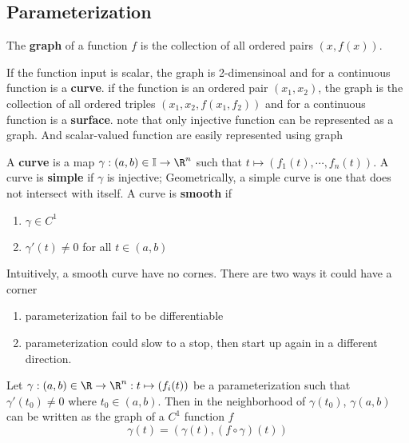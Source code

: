 \documentclass[11pt]{article}
\begin{document}
\subsection{Parameterization}


\begin{defn*}
  The \textbf{graph} of a function $f$ is the collection of all ordered pairs $(x, f(x))$.
  \begin{rem}
    If the function input is scalar, the graph is 2-dimensinoal and for a continuous function is a \textbf{curve}. if the function is an ordered pair $(x_1, x_2)$, the graph is the collection of all ordered triples $(x_1, x_2, f(x_1, f_2))$ and for a continuous function is a \textbf{surface}. note that only injective function can be represented as a graph. And scalar-valued function are easily represented using graph
  \end{rem}
\end{defn*}


\begin{defn*}
  A \textbf{curve} is a map $\gamma : (a,b) \in \mathbb{I} \to \R^n$ such that $t \mapsto (f_1(t),\cdots, f_n(t))$. A curve is \textbf{simple} if $\gamma$ is injective; Geometrically, a simple curve is one that does not intersect with itself. A curve is \textbf{smooth} if
  \begin{enumerate}
    \item $\gamma\in C^1$
    \item $\gamma'(t) \neq 0$ for all $t\in (a,b)$
  \end{enumerate}
  \begin{rem}
    Intuitively, a smooth curve have no cornes. There are two ways it could have a corner
    \begin{enumerate}
      \item parameterization fail to be differentiable
      \item parameterization could slow to a stop, then start up again in a different direction.
    \end{enumerate}
  \end{rem}
\end{defn*}

\begin{theorem*}
  Let $\gamma: (a,b) \in \R \to \R^n : t \mapsto (f_i(t))$ be a parameterization such that $\gamma'(t_0) \neq 0$ where $t_0\in (a,b)$. Then in the neighborhood of $\gamma(t_0)$, $\gamma(a,b)$ can be written as the graph of a $C^1$ function $f$
  \[
    \gamma(t) = (\gamma(t), (f\circ \gamma)(t))
  \]
\end{theorem*}
\end{document}
